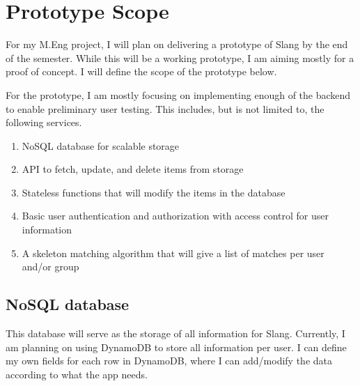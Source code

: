 \documentclass[12pt]{article}
\def\ind{\hspace*{0.3in}}
\begin{document}
\setlength{\parindent}{0in}
\addtolength{\parskip}{0.1cm}
\setlength{\fboxrule}{.5mm}\setlength{\fboxsep}{1.2mm}
\newlength{\boxlength}\setlength{\boxlength}{\textwidth}
\addtolength{\boxlength}{-4mm}
\begin{center}
\end{center}
\vspace{2mm}

\section*{Prototype Scope}

\ind For my M.Eng project, I will plan on delivering a prototype of Slang by the end of the semester. While this will be a working prototype, I am aiming mostly for a proof of concept. I will define the scope of the prototype below.

For the prototype, I am mostly focusing on implementing enough of the backend to enable preliminary user testing. This includes, but is not limited to, the following services.

\begin{enumerate}
    \item NoSQL database for scalable storage
    \item API to fetch, update, and delete items from storage
    \item Stateless functions that will modify the items in the database
    \item Basic user authentication and authorization with access control for user information
    \item A skeleton matching algorithm that will give a list of matches per user and/or group
\end{enumerate}

\subsection*{NoSQL database}

\ind This database will serve as the storage of all information for Slang. Currently, I am planning on using DynamoDB to store all information per user. I can define my own fields for each row in DynamoDB, where I can add/modify the data according to what the app needs. 
\end{document}
